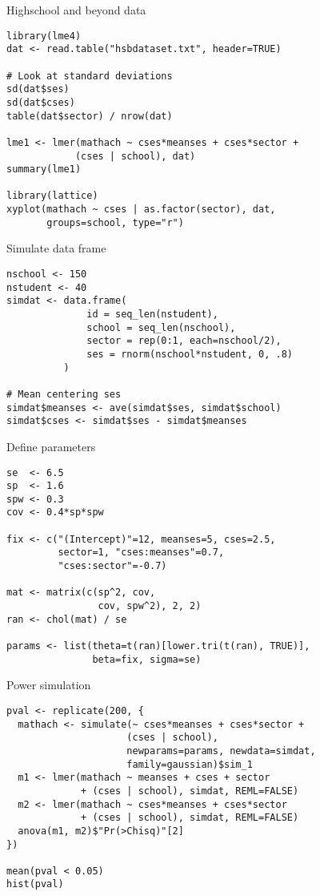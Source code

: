 \documentclass{beamer}
\begin{document}
{

\begin{frame}[fragile]{Highschool and beyond data}
  \begin{lstlisting}
library(lme4)
dat <- read.table("hsbdataset.txt", header=TRUE)

# Look at standard deviations
sd(dat$ses)
sd(dat$cses)
table(dat$sector) / nrow(dat)

lme1 <- lmer(mathach ~ cses*meanses + cses*sector + 
            (cses | school), dat)
summary(lme1)

library(lattice)
xyplot(mathach ~ cses | as.factor(sector), dat, 
       groups=school, type="r")
  \end{lstlisting}
\end{frame}


\begin{frame}[fragile]{Simulate data frame}
  \begin{lstlisting}
nschool <- 150
nstudent <- 40
simdat <- data.frame( 
              id = seq_len(nstudent),
              school = seq_len(nschool),
              sector = rep(0:1, each=nschool/2),
              ses = rnorm(nschool*nstudent, 0, .8)
          )

# Mean centering ses
simdat$meanses <- ave(simdat$ses, simdat$school)
simdat$cses <- simdat$ses - simdat$meanses
  \end{lstlisting}
\end{frame}

\begin{frame}[fragile]{Define parameters}
  \begin{lstlisting}
se  <- 6.5
sp  <- 1.6
spw <- 0.3
cov <- 0.4*sp*spw

fix <- c("(Intercept)"=12, meanses=5, cses=2.5, 
         sector=1, "cses:meanses"=0.7, 
         "cses:sector"=-0.7)

mat <- matrix(c(sp^2, cov,
                cov, spw^2), 2, 2)
ran <- chol(mat) / se

params <- list(theta=t(ran)[lower.tri(t(ran), TRUE)],
               beta=fix, sigma=se)
  \end{lstlisting}
\end{frame}


\begin{frame}[fragile]{Power simulation}
  \begin{lstlisting}
pval <- replicate(200, {
  mathach <- simulate(~ cses*meanses + cses*sector + 
                     (cses | school),
                     newparams=params, newdata=simdat,
                     family=gaussian)$sim_1
  m1 <- lmer(mathach ~ meanses + cses + sector
             + (cses | school), simdat, REML=FALSE)
  m2 <- lmer(mathach ~ cses*meanses + cses*sector
             + (cses | school), simdat, REML=FALSE)
  anova(m1, m2)$"Pr(>Chisq)"[2]
})

mean(pval < 0.05)
hist(pval)
  \end{lstlisting}
\end{frame}

}
\end{document}
